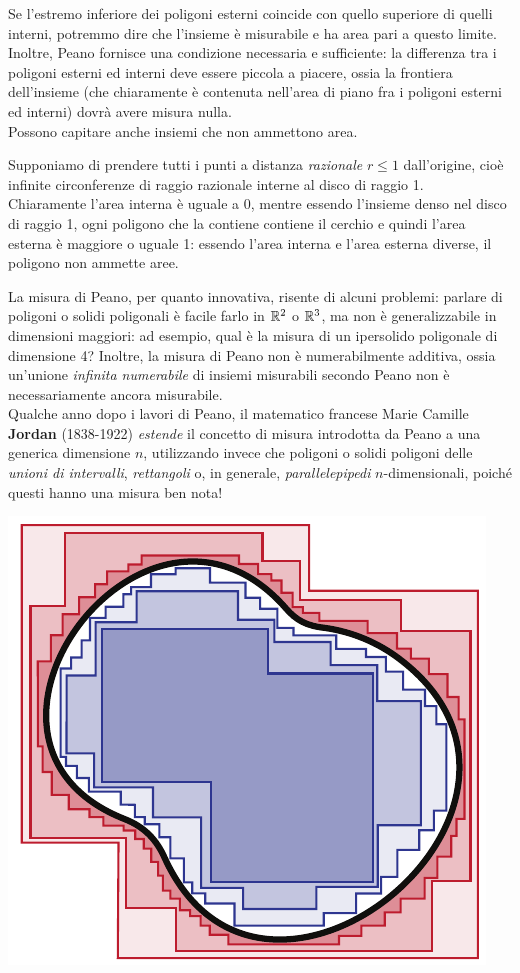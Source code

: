 Se l'estremo inferiore dei poligoni esterni coincide con quello superiore di quelli interni, potremmo dire che l'insieme è misurabile e ha area pari a questo limite.
Inoltre, Peano fornisce una condizione necessaria e sufficiente: la differenza tra i poligoni esterni ed interni deve essere piccola a piacere, ossia la frontiera dell'insieme (che chiaramente è contenuta nell'area di piano fra i poligoni esterni ed interni) dovrà avere misura nulla.\\
Possono capitare anche insiemi che non ammettono area. 
\begin{example}
	Supponiamo di prendere tutti i punti a distanza \textit{razionale} $r\leq 1$ dall'origine, cioè infinite circonferenze di raggio razionale interne al disco di raggio 1.\\
	Chiaramente l'area interna è uguale a 0, mentre essendo l'insieme denso nel disco di raggio 1, ogni poligono che la contiene contiene il cerchio e quindi l'area esterna è maggiore o uguale 1: essendo l'area interna e l'area esterna diverse, il poligono non ammette aree.
\end{example}
La misura di Peano, per quanto innovativa, risente di alcuni problemi: parlare di poligoni o solidi poligonali è facile farlo in $\mathbb{R}^2$ o $\mathbb{R}^3$, ma non è generalizzabile in dimensioni maggiori: ad esempio, qual è la misura di un ipersolido poligonale di dimensione 4? Inoltre, la misura di Peano non è numerabilmente additiva, ossia un'unione \textit{infinita numerabile} di insiemi misurabili secondo Peano non è necessariamente ancora misurabile.\\
Qualche anno dopo i lavori di Peano, il matematico francese Marie Camille \textbf{Jordan} (1838-1922) \textit{estende} il concetto di misura introdotta da Peano a una generica dimensione $n$, utilizzando invece che poligoni o solidi poligoni delle \textit{unioni di intervalli}, \textit{rettangoli} o, in generale, \textit{parallelepipedi} $n$-dimensionali, poiché questi hanno una misura ben nota!
\begin{center}
	\includegraphics[trim=0cm 0cm 0cm 0cm, clip, scale=0.71]{images/peanoparallelepipedi.pdf}
\end{center}
